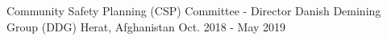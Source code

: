 
\begin{cventries}

  \cventry
    {Community Safety Planning (CSP) Committee - Director} %
    {Danish Demining Group (DDG) } %
    {Herat, Afghanistan} %
    {Oct. 2018 - May 2019} %
    {
    }

\vspace{-2em}
\end{cventries}
